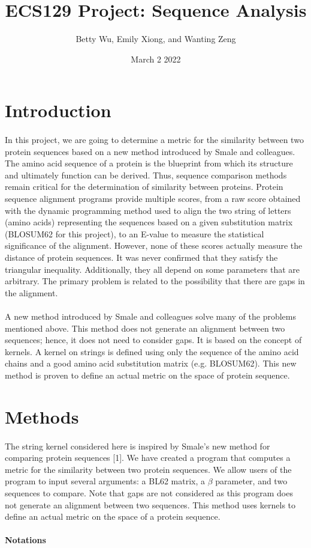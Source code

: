 \documentclass{article}
\title{ECS129 Project: Sequence Analysis}
\author{Betty Wu, Emily Xiong, and Wanting Zeng  }
\date{March 2 2022}
\begin{document}
\maketitle

\section{Introduction}

\paragraph{}
In this project, we are going to determine a metric for the similarity between two protein sequences based on a new method introduced by Smale and colleagues. The amino acid sequence of a protein is the blueprint from which its structure and ultimately function can be derived. Thus, sequence comparison methods remain critical for the determination of similarity between proteins. Protein sequence alignment programs provide multiple scores, from a raw score obtained with the dynamic programming method used to align the two string of letters (amino acids) representing the sequences based on a given substitution matrix (BLOSUM62 for this project), to an E-value to measure the statistical significance of the alignment. However, none of these scores actually measure the distance of protein sequences. It was never confirmed that they satisfy the triangular inequality. Additionally, they all depend on some parameters that are arbitrary. The primary problem is related to the possibility that there are gaps in the alignment. 
\\\\
A new method introduced by Smale and colleagues solve many of the problems mentioned above. This method does not generate an alignment between two sequences; hence, it does not need to consider gaps. It is based on the concept of kernels. A kernel on strings is defined using only the sequence of the amino acid chains and a good amino acid substitution matrix (e.g. BLOSUM62). This new method is proven to define an actual metric on the space of protein sequence.

\section{Methods}
\paragraph{}
The string kernel considered here is inspired by Smale’s new method for comparing protein sequences [1]. We have created a program that computes a metric for the similarity between two protein sequences. We allow users of the program to input several arguments: a BL62 matrix, a $\beta$ parameter, and two sequences to compare. Note that gaps are not considered as this program does not generate an alignment between two sequences. This method uses kernels to define an actual metric on the space of a protein sequence. 
\\\\
\textbf{Notations}
\end{document}
